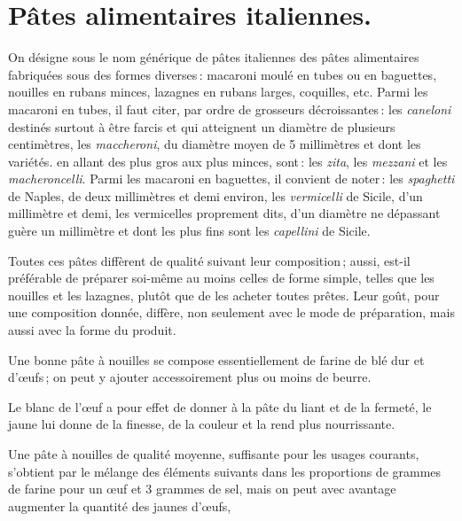 \section*{\centering Pâtes alimentaires italiennes.}
{}

On désigne sous le nom générique de pâtes italiennes des pâtes alimentaires
fabriquées sous des formes diverses : macaroni moulé en tubes ou en baguettes,
nouilles en rubans minces, lazagnes en rubans larges, coquilles, etc. Parmi les
macaroni en tubes, il faut citer, par ordre de grosseurs décroissantes : les
\textit{caneloni} destinés surtout à être farcis et qui atteignent un diamètre
de plusieurs centimètres, les \textit{maccheroni}, du diamètre moyen de
5 millimètres et dont les variétés. en allant des plus gros aux plus minces,
sont : les \textit{zita}, les \textit{mezzani} et les \textit{macheroncelli}.
Parmi les macaroni en baguettes, il convient de noter : les \textit{spaghetti}
de Naples, de deux millimètres et demi environ, les \textit{vermicelli} de
Sicile, d'un millimètre et demi, les vermicelles proprement dits, d'un diamètre
ne dépassant guère un millimètre et dont les plus fins sont les
\textit{capellini} de Sicile.

Toutes ces pâtes diffèrent de qualité suivant leur composition ; aussi, est-il
préférable de préparer soi-même au moins celles de forme simple, telles que les
nouilles et les lazagnes, plutôt que de les acheter toutes prêtes. Leur goût,
pour une composition donnée, diffère, non seulement avec le mode de
préparation, mais aussi avec la forme du produit.

\sk

Une bonne pâte à nouilles se compose essentiellement de farine de blé dur et
d'œufs ; on peut y ajouter accessoirement plus ou moins de beurre.

Le blanc de l'œuf a pour effet de donner à la pâte du liant et de la fermeté,
le jaune lui donne de la finesse, de la couleur et la rend plus nourrissante.
\label{pg0680} \hypertarget{p0680}{}

Une pâte à nouilles de qualité moyenne, suffisante pour les usages courants,
s'obtient par le mélange des éléments suivants dans les proportions de
{\mmm} grammes de farine pour un œuf et 3 grammes de sel, mais on peut
avec avantage augmenter la quantité des jaunes d'œufs,

